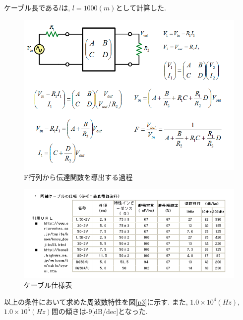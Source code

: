 \documentclass[a4j,12pt,]{jarticle}
\begin{document}
ケーブル長である$l$は, $l = 1000(m)$として計算した.

\begin{figure}[H]
  \begin{center}
    \includegraphics[width=140mm]{transfer.png}
    \caption{F行列から伝達関数を導出する過程}
    \label{p1}
  \end{center}
\end{figure}

\begin{figure}[H]
  \begin{center}
    \includegraphics[width=160mm]{coaxial_cable_sheet.png}
    \caption{ケーブル仕様表}
    \label{p2}
  \end{center}
\end{figure}
以上の条件において求めた周波数特性を図\ref{p3}に示す.
また, $1.0 × 10^{4}(Hz)$, $1.0 × 10^{5}(Hz)$間の傾きは-9[dB/dec]となった.
\end{document}
